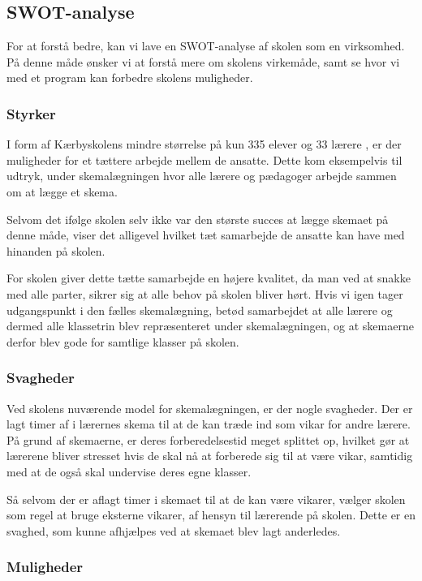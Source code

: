 \subsection{SWOT-analyse}
For at forstå \school bedre, kan vi lave en SWOT-analyse af skolen som en virksomhed. På denne måde ønsker vi at forstå mere om skolens virkemåde, samt se hvor vi med et program kan forbedre skolens muligheder.

\subsubsection*{Styrker}
I form af Kærbyskolens mindre størrelse på kun 335 elever og 33 lærere \cite{Kaerbyskolens-laerere}, er der muligheder for et tættere arbejde mellem de ansatte. Dette kom eksempelvis til udtryk, under skemalægningen hvor alle lærere og pædagoger arbejde sammen om at lægge et skema.

Selvom det ifølge skolen selv ikke var den største succes at lægge skemaet på denne måde, viser det alligevel hvilket tæt samarbejde de ansatte kan have med hinanden på skolen.

For skolen giver dette tætte samarbejde en højere kvalitet, da man ved at snakke med alle parter, sikrer sig at alle behov på skolen bliver hørt. Hvis vi igen tager udgangspunkt i den fælles skemalægning, betød samarbejdet at alle lærere og dermed alle klassetrin blev repræsenteret under skemalægningen, og at skemaerne derfor blev gode for samtlige klasser på skolen. 

\subsubsection*{Svagheder}
Ved skolens nuværende model for skemalægningen, er der nogle svagheder. Der er lagt timer af i lærernes skema til at de kan træde ind som vikar for andre lærere. På grund af skemaerne, er deres forberedelsestid meget splittet op, hvilket gør at lærerene bliver stresset hvis de skal nå at forberede sig til at være vikar, samtidig med at de også skal undervise deres egne klasser.

Så selvom der er aflagt timer i skemaet til at de kan være vikarer, vælger skolen som regel at bruge eksterne vikarer, af hensyn til lærerende på skolen. Dette er en svaghed, som kunne afhjælpes ved at skemaet blev lagt anderledes.

\subsubsection*{Muligheder}


